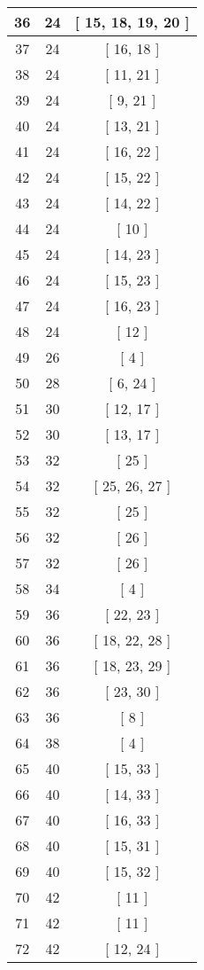 \begin{center}
\begin{longtable}[H]{|| c c c ||}
\hline
36 & 24 & [ 15, 18, 19, 20 ] \\ 
\hline
37 & 24 & [ 16, 18 ] \\ 
\hline
38 & 24 & [ 11, 21 ] \\ 
\hline
39 & 24 & [ 9, 21 ] \\ 
\hline
40 & 24 & [ 13, 21 ] \\ 
\hline
41 & 24 & [ 16, 22 ] \\ 
\hline
42 & 24 & [ 15, 22 ] \\ 
\hline
43 & 24 & [ 14, 22 ] \\ 
\hline
44 & 24 & [ 10 ] \\ 
\hline
45 & 24 & [ 14, 23 ] \\ 
\hline
46 & 24 & [ 15, 23 ] \\ 
\hline
47 & 24 & [ 16, 23 ] \\ 
\hline
48 & 24 & [ 12 ] \\ 
\hline
49 & 26 & [ 4 ] \\ 
\hline
50 & 28 & [ 6, 24 ] \\ 
\hline
51 & 30 & [ 12, 17 ] \\ 
\hline
52 & 30 & [ 13, 17 ] \\ 
\hline
53 & 32 & [ 25 ] \\ 
\hline
54 & 32 & [ 25, 26, 27 ] \\ 
\hline
55 & 32 & [ 25 ] \\ 
\hline
56 & 32 & [ 26 ] \\ 
\hline
57 & 32 & [ 26 ] \\ 
\hline
58 & 34 & [ 4 ] \\ 
\hline
59 & 36 & [ 22, 23 ] \\ 
\hline
60 & 36 & [ 18, 22, 28 ] \\ 
\hline
61 & 36 & [ 18, 23, 29 ] \\ 
\hline
62 & 36 & [ 23, 30 ] \\ 
\hline
63 & 36 & [ 8 ] \\ 
\hline
64 & 38 & [ 4 ] \\ 
\hline
65 & 40 & [ 15, 33 ] \\ 
\hline
66 & 40 & [ 14, 33 ] \\ 
\hline
67 & 40 & [ 16, 33 ] \\ 
\hline
68 & 40 & [ 15, 31 ] \\ 
\hline
69 & 40 & [ 15, 32 ] \\ 
\hline
70 & 42 & [ 11 ] \\ 
\hline
71 & 42 & [ 11 ] \\ 
\hline
72 & 42 & [ 12, 24 ] \\ 

\end{longtable}
\end{center}
